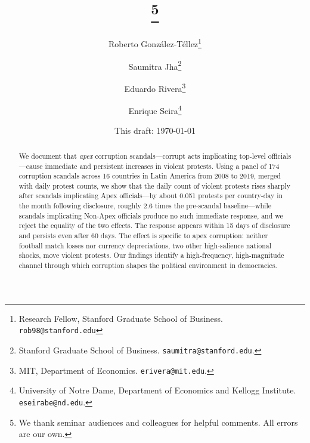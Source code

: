 \documentclass[11pt]{article}
\title{\bfseries\Large \papertitle\thanks{We thank seminar audiences and colleagues for helpful comments. All errors are our own.}}
\author{%
Roberto Gonz\'alez-T\'ellez\thanks{Research Fellow, Stanford Graduate School of Business. \texttt{rob98@stanford.edu}}  \and Saumitra Jha\thanks{Stanford Graduate School of Business. \texttt{saumitra@stanford.edu}.}
\and
Eduardo Rivera\thanks{MIT, Department of Economics. \texttt{erivera@mit.edu}.} \and
Enrique Seira\thanks{University of Notre Dame, Department of Economics and Kellogg Institute. \texttt{eseirabe@nd.edu}.}
%
}
\date{This draft: \today}
\begin{document}
\renewcommand{\sectionautorefname}{Supplementary Materials}
\renewcommand{\subsectionautorefname}{Supplementary Materials}
\renewcommand{\appendixautorefname}{Supplementary Materials}

\maketitle

\begin{abstract}
    \noindent We document that \textit{apex} corruption scandals---corrupt acts implicating top-level officials---cause immediate and persistent increases in violent protests. Using a panel of 174 corruption scandals across 16 countries in Latin America from 2008 to 2019, merged with daily protest counts, we show that the daily count of violent protests rises sharply after scandals implicating Apex officials---by about 0.051 protests per country-day in the month following disclosure, roughly 2.6 times the pre-scandal baseline---while scandals implicating Non-Apex officials produce no such immediate response, and we reject the equality of the two effects. The response appears within 15 days of disclosure and persists even after 60 days. The effect is specific to apex corruption: neither football match losses nor currency depreciations, two other high-salience national shocks, move violent protests. Our findings identify a high-frequency, high-magnitude channel through which corruption shapes the political environment in democracies.
\end{abstract}


\bigskip

\clearpage
\end{document}
